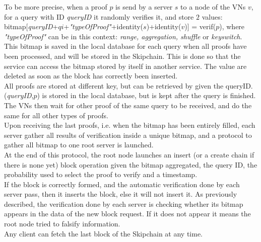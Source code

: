 \documentclass{article}
\begin{document}
To be more precise, when a proof $p$ is send by a server $s$ to a node of the VNs $v$, for a query with ID \textit{queryID} it randomly verifies it, and store $2$ values:\\
bitmap[\textit{queryID}+$qi$+\textit{"typeOfProof"}+identity($s$)+identity($v$)] = verif($p$), where \textit{"typeOfProof"} can be in this context: \textit{range, aggregation, shuffle} or \textit{keyswitch}.\\
This bitmap is saved in the local database for each query when all proofs have been processed, and will be stored in the Skipchain. This is done so that the service can access the bitmap stored by itself in another service. The value are deleted as  soon as the block has correctly been inserted.\\
All proofs are stored at different key, but can be retrieved by given the queryID. (\textit{queryID},$p$) is stored in the local database, but is kept after the query is finished.\\

The VNs then wait for other proof of the same query to be received, and do the same for all other types of proofs.\\
Upon receiving the last proofs, i.e. when the bitmap has been entirely filled, each server gather all results of verification inside a unique bitmap, and a protocol to gather all bitmap to one root server is launched.\\
At the end of this protocol, the root node launches an insert (or a create chain if there is none yet) block operation given the bitmap aggregated, the query ID, the probability used to select the proof to verify and a timestamp.\\
If the block is correctly formed, and the automatic verification done by each server pass, then it inserts the block, else it will not insert it. As previously described, the verification done by each server is checking whether its bitmap appears in the data of the new block request. If it does not appear it means the root node tried to falsify information.\\
Any client can fetch the last block of the Skipchain at any time.\\
\end{document}
